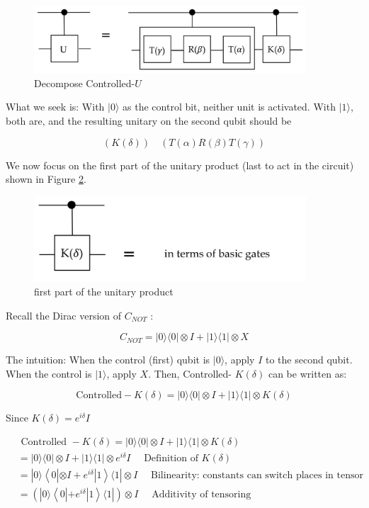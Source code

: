 \documentclass[main.tex]{subfiles}
\begin{document}
    \begin{figure}
        \centering
        \includegraphics[width=4in]{notes/figs/n09/03universal3.png}
        \caption{Decompose Controlled-$U$}
        \label{fig:03universal3}
    \end{figure}
    
    What we seek is: With $|0\rangle$ as the control bit, neither unit is activated. With $|1\rangle$, both are, and the resulting unitary on the second qubit should be
    
    $$
    (K(\delta)) \quad(T(\alpha) R(\beta) T(\gamma))
    $$
    
    We now focus on the first part of the unitary product (last to act in the circuit) shown in Figure \ref{fig:04universal4}.
    
    \begin{figure}
        \centering
        \includegraphics[width=4in]{notes/figs/n09/04universal4.png}
        \caption{first part of the unitary product}
        \label{fig:04universal4}
    \end{figure}
    
    Recall the Dirac version of $C_{NOT}$ :
    
    $$
    C_{NOT}=|0\rangle\langle 0|\otimes I+| 1\rangle\langle 1| \otimes X
    $$
    
    The intuition: When the control (first) qubit is $|0\rangle$, apply $I$ to the second qubit. When the control is $|1\rangle$, apply $X$. Then, Controlled- $K(\delta)$ can be written as:
    
    $$
    \text{Controlled}-K(\delta)=|0\rangle\langle 0|\otimes I+| 1\rangle\langle 1| \otimes K(\delta)
    $$
    
    Since $K(\delta)=e^{i \delta} I$
        
    $$
    \begin{aligned}
    &\text { Controlled }-K(\delta)=|0\rangle\langle 0|\otimes I+| 1\rangle\langle 1| \otimes K(\delta)\\
    &=|0\rangle\langle 0|\otimes I+| 1\rangle\langle 1| \otimes e^{i \delta} I \quad \text { Definition of } K(\delta)\\
    &=|0\rangle\left\langle 0\left|\otimes I+e^{i \delta}\right| 1\right\rangle\langle 1| \otimes I \quad \text { Bilinearity: constants can switch places in tensor }\\
    &=\left(|0\rangle\left\langle 0\left|+e^{i \delta}\right| 1\right\rangle\langle 1|\right) \otimes I \quad \text { Additivity of tensoring }
    \end{aligned}
    $$
    
\end{document}
